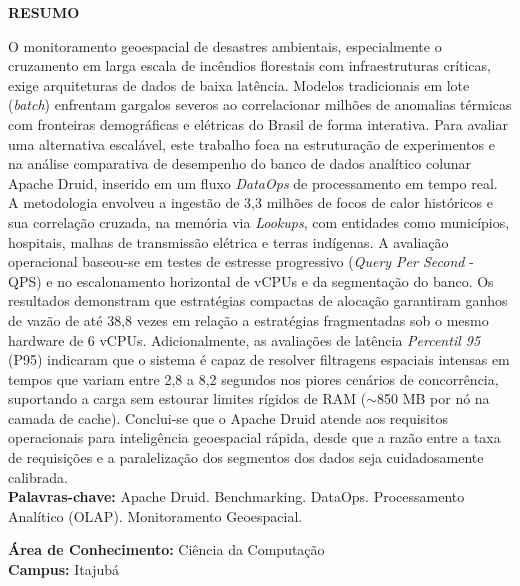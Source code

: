 \begin{singlespace}
\begin{center}
\textbf{RESUMO}
\end{center}
O monitoramento geoespacial de desastres ambientais, especialmente o cruzamento em larga escala de incêndios florestais com infraestruturas críticas, exige arquiteturas de dados de baixa latência. Modelos tradicionais em lote (\textit{batch}) enfrentam gargalos severos ao correlacionar milhões de anomalias térmicas com fronteiras demográficas e elétricas do Brasil de forma interativa. Para avaliar uma alternativa escalável, este trabalho foca na estruturação de experimentos e na análise comparativa de desempenho do banco de dados analítico colunar Apache Druid, inserido em um fluxo \textit{DataOps} de processamento em tempo real. A metodologia envolveu a ingestão de 3,3 milhões de focos de calor históricos e sua correlação cruzada, na memória via \textit{Lookups}, com entidades como municípios, hospitais, malhas de transmissão elétrica e terras indígenas. A avaliação operacional baseou-se em testes de estresse progressivo (\textit{Query Per Second} - QPS) e no escalonamento horizontal de vCPUs e da segmentação do banco. Os resultados demonstram que estratégias compactas de alocação garantiram ganhos de vazão de até 38,8 vezes em relação a estratégias fragmentadas sob o mesmo hardware de 6 vCPUs. Adicionalmente, as avaliações de latência \textit{Percentil 95} (P95) indicaram que o sistema é capaz de resolver filtragens espaciais intensas em tempos que variam entre 2,8 a 8,2 segundos nos piores cenários de concorrência, suportando a carga sem estourar limites rígidos de RAM ($\sim$850 MB por nó na camada de cache). Conclui-se que o Apache Druid atende aos requisitos operacionais para inteligência geoespacial rápida, desde que a razão entre a taxa de requisições e a paralelização dos segmentos dos dados seja cuidadosamente calibrada.\\
\textbf{Palavras-chave:} Apache Druid. Benchmarking. DataOps. Processamento Analítico (OLAP). Monitoramento Geoespacial.

\vspace{\baselineskip}
\noindent\textbf{Área de Conhecimento:} Ciência da Computação\\
\textbf{Campus:} Itajubá
\end{singlespace}

\vspace{0.3cm}
